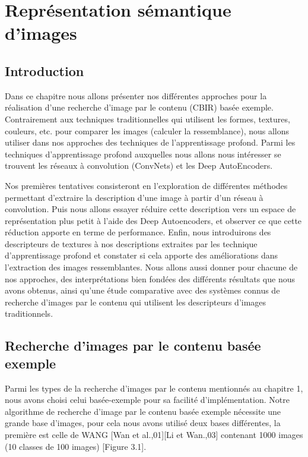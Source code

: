 
\chapter{Représentation sémantique d'images} %



\section{Introduction}
	Dans ce chapitre nous allons présenter nos différentes approches pour la réalisation d'une recherche d'image par le contenu (CBIR) basée exemple. Contrairement aux techniques traditionnelles qui utilisent les formes, textures, couleurs, etc. pour comparer les images (calculer la ressemblance), nous allons utiliser dans nos approches des techniques de l'apprentissage profond. Parmi les techniques d'apprentissage profond auxquelles nous allons nous intéresser se trouvent les réseaux à convolution (ConvNets) et les Deep AutoEncoders. 
	
	Nos premières tentatives consisteront en l'exploration de différentes méthodes permettant d'extraire la description d'une image à partir d'un réseau à convolution. Puis nous allons essayer réduire cette description vers un espace de représentation plus petit à l'aide des Deep Autoencoders, et observer ce que cette réduction apporte en terme de performance. Enfin, nous introduirons des descripteurs de textures à nos descriptions extraites par les technique d'apprentissage profond et constater si cela apporte des améliorations dans l'extraction des images ressemblantes. Nous allons aussi donner pour chacune de nos approches, des interprétations bien fondées des différents résultats que nous avons obtenus, ainsi qu'une étude comparative avec des systèmes connus de recherche d'images par le contenu qui utilisent les descripteurs d'images traditionnels.
	
	


\section{Recherche d'images par le contenu basée exemple}
	Parmi les types de la recherche d'images par le contenu mentionnés au chapitre 1, nous avons choisi celui basée-exemple pour sa facilité d'implémentation. Notre algorithme de recherche d'image par le contenu basée exemple nécessite une grande base d'images, pour cela nous avons utilisé deux bases différentes, la première est celle de WANG [Wan et al.,01][Li et Wan.,03] contenant 1000 images (10 classes de 100 images) [Figure 3.1].

